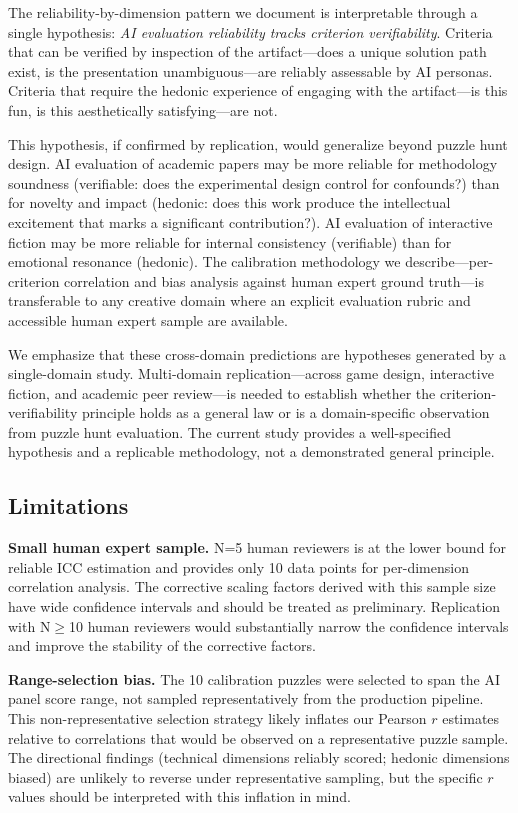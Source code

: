 The reliability-by-dimension pattern we document is interpretable through a single hypothesis: \emph{AI evaluation reliability tracks criterion verifiability}. Criteria that can be verified by inspection of the artifact---does a unique solution path exist, is the presentation unambiguous---are reliably assessable by AI personas. Criteria that require the hedonic experience of engaging with the artifact---is this fun, is this aesthetically satisfying---are not.

This hypothesis, if confirmed by replication, would generalize beyond puzzle hunt design. AI evaluation of academic papers may be more reliable for methodology soundness (verifiable: does the experimental design control for confounds?) than for novelty and impact (hedonic: does this work produce the intellectual excitement that marks a significant contribution?). AI evaluation of interactive fiction may be more reliable for internal consistency (verifiable) than for emotional resonance (hedonic). The calibration methodology we describe---per-criterion correlation and bias analysis against human expert ground truth---is transferable to any creative domain where an explicit evaluation rubric and accessible human expert sample are available.

We emphasize that these cross-domain predictions are hypotheses generated by a single-domain study. Multi-domain replication---across game design, interactive fiction, and academic peer review---is needed to establish whether the criterion-verifiability principle holds as a general law or is a domain-specific observation from puzzle hunt evaluation. The current study provides a well-specified hypothesis and a replicable methodology, not a demonstrated general principle.

\subsection{Limitations}

\textbf{Small human expert sample.} N=5 human reviewers is at the lower bound for reliable ICC estimation and provides only 10 data points for per-dimension correlation analysis. The corrective scaling factors derived with this sample size have wide confidence intervals and should be treated as preliminary. Replication with N$\geq$10 human reviewers would substantially narrow the confidence intervals and improve the stability of the corrective factors.

\textbf{Range-selection bias.} The 10 calibration puzzles were selected to span the AI panel score range, not sampled representatively from the production pipeline. This non-representative selection strategy likely inflates our Pearson $r$ estimates relative to correlations that would be observed on a representative puzzle sample. The directional findings (technical dimensions reliably scored; hedonic dimensions biased) are unlikely to reverse under representative sampling, but the specific $r$ values should be interpreted with this inflation in mind.

